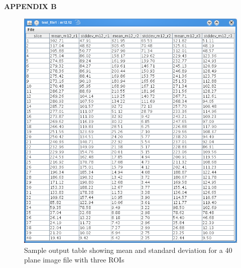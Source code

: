 \documentclass{article}
\begin{document}
\newpage
\begin{center}\LARGE{\textbf{APPENDIX B}}\end{center} 
\vfill
\begin{figure}[ht]
\centering
\includegraphics[scale=0.8]{snapshot_Table.png}
\caption{Sample output table showing mean and standard deviation
for a 40 plane image file with three ROIs}
\end{figure}
\vfill
\end{document}

